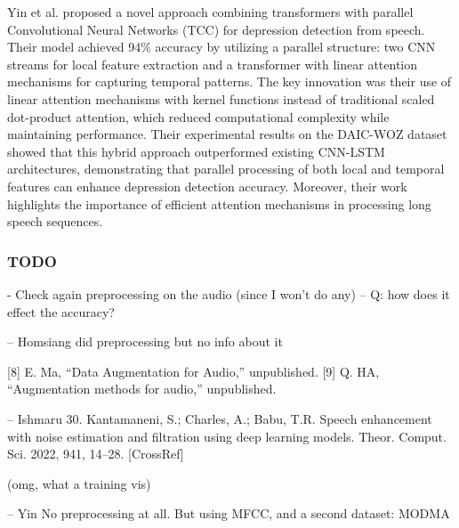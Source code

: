 Yin et al. \cite{yin2023depression} proposed a novel approach combining transformers with parallel Convolutional Neural Networks (TCC) for depression detection from speech. Their model achieved 94\% accuracy by utilizing a parallel structure: two CNN streams for local feature extraction and a transformer with linear attention mechanisms for capturing temporal patterns. The key innovation was their use of linear attention mechanisms with kernel functions instead of traditional scaled dot-product attention, which reduced computational complexity while maintaining performance. Their experimental results on the DAIC-WOZ dataset showed that this hybrid approach outperformed existing CNN-LSTM architectures, demonstrating that parallel processing of both local and temporal features can enhance depression detection accuracy. Moreover, their work highlights the importance of efficient attention mechanisms in processing long speech sequences.
\subsubsection{TODO}
- Check again preprocessing on the audio (since I won't do any)
-- Q: how does it effect the accuracy? 

-- Homsiang did preprocessing but no info about it

[8] E. Ma, “Data Augmentation for Audio,” unpublished.
[9] Q. HA, “Augmentation methods for audio,” unpublished.

-- Ishmaru
30. Kantamaneni, S.; Charles, A.; Babu, T.R. Speech enhancement with noise estimation and filtration using deep learning models.
Theor. Comput. Sci. 2022, 941, 14–28. [CrossRef]

(omg, what a training vis)

-- Yin
No preprocessing at all. But using MFCC, and a second dataset: MODMA



\begin{comment}
---------------
Homsiang et al. (2022): 0.95 accuracy - Classification of Depression Audio Data by Deep Learning
cite - homsiang2022classification

Ishmaru et al. (2023): 0.97 accuracy
Classification of Depression and Its Severity Based on Multiple
Audio Features Using a Graphical Convolutional Neural Network
cite - ishimaru2023classification

Yin et al. (2023): 0.94 accuracy
Depression Detection in Speech Using Transformer and Parallel
Convolutional Neural Networks
cite - yin2023depression

\end{comment}